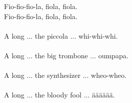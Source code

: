             Fio-fio-fio-la, fiola, fiola.  \\
            Fio-fio-fio-la, fiola, fiola. \\
\hspace{10mm} \\
            A long ... the piccola ... whi-whi-whi. \\
\hspace{10mm} \\
            A long ... the big trombone ... oumpapa. \\
\hspace{10mm} \\
            A long ... the synthesizer ... wheo-wheo. \\
\hspace{10mm} \\
            A long ... the bloody fool ... ääääää. \\
